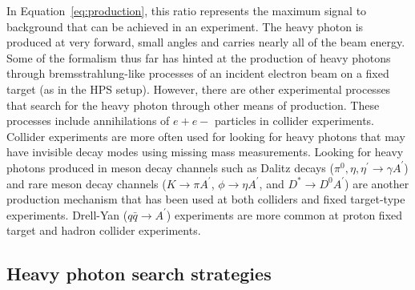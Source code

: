 In Equation~\eqref{eq:production}, this ratio represents the maximum signal to background that can be achieved in an experiment. The heavy photon is produced at very forward, small angles and carries nearly all of the beam energy. \\
\indent Some of the formalism thus far has hinted at the production of heavy photons through bremsstrahlung-like processes of an incident electron beam on a fixed target (as in the HPS setup). However, there are other experimental processes that search for the heavy photon through other means of production. These processes include annihilations of $e+e-$ particles in collider experiments. Collider experiments are more often used for looking for heavy photons that may have invisible decay modes using missing mass measurements. Looking for heavy photons produced in meson decay channels such as Dalitz decays ($\pi^0, \eta, \eta^{\prime}\rightarrow \gamma A^{\prime}$) and rare meson decay channels ($K\rightarrow\pi A^{\prime} $, $\phi\rightarrow\eta A^{\prime}$, and $D^{\ast}\rightarrow D^{0}A^{\prime}$) are another production mechanism that has been used at both colliders and fixed target-type experiments. Drell-Yan ($q\bar{q}\rightarrow A^{\prime}$) experiments are more common at proton fixed target and hadron collider experiments. 

\subsection{Heavy photon search strategies}

